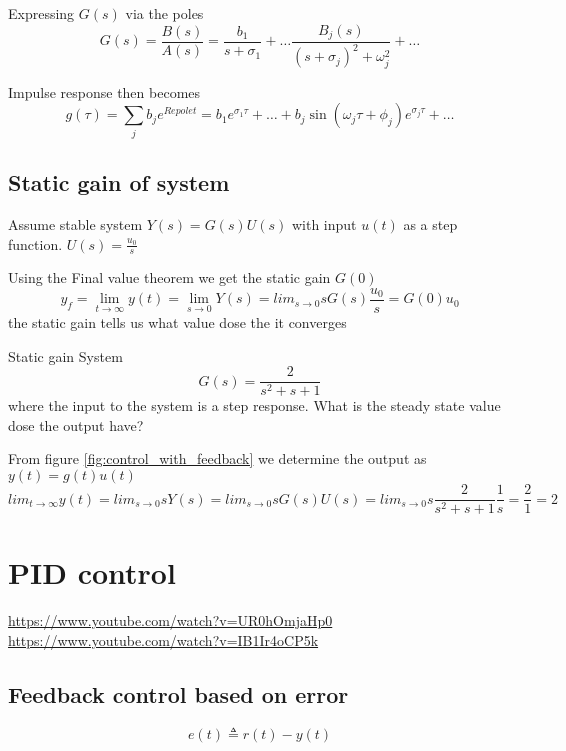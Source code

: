 \documentclass{article}
\begin{document}
Expressing $G(s)$ via the poles
\begin{equation*}
    G(s)=\frac{B(s)}{A(s)}= \frac{b_1}{s+\sigma_1} + \ldots \frac{B_j(s)}{(s+\sigma_j)^2+\omega_j^2} + \ldots
\end{equation*}

Impulse response then becomes
\begin{equation*}
   g(\tau) = \sum_j b_je^{Re{pole}t} = b_1e^{\sigma_1\tau}+\ldots+b_j\sin(\omega_j\tau+\phi_j)e^{\sigma_j\tau}+\ldots
\end{equation*}

\subsection{Static gain of system}
Assume stable system $Y(s)=G(s)U(s)$ with input $u(t)$ as a step function. $U(s)=\frac{u_0}{s}$

Using the Final value theorem we get the static gain $G(0)$
\begin{equation*}
    y_f  = \lim_{t\to\infty}y(t) = \lim_{s\to 0}Y(s) = lim_{s\to 0}sG(s)\frac{u_0}{s} = G(0)u_0
\end{equation*}
the static gain tells us what value dose the it converges

\begin{exampleblock}{Static gain}
   System
   \begin{equation*}
       G(s)=\frac{2}{s^2 + s + 1}
   \end{equation*}
   where the input to the system is a step response. What is the steady state value dose
   the output have?

   From figure \ref{fig:control_with_feedback} we determine the output as $y(t)=g(t)u(t)$
   \begin{equation*}
        lim_{t\to\infty}y(t) = lim_{s\to0} sY(s) = lim_{s\to0} sG(s)U(s) = lim_{s\to0} s\frac{2}{s^2 + s + 1}\frac{1}{s} = \frac{2}{1} = 2
   \end{equation*}
\end{exampleblock}

\section{PID control}
\url{https://www.youtube.com/watch?v=UR0hOmjaHp0} \newline
\url{https://www.youtube.com/watch?v=IB1Ir4oCP5k}
\subsection{Feedback control based on error}
\begin{equation*}
    e(t) \triangleq r(t)-y(t)
\end{equation*}
\end{document}
